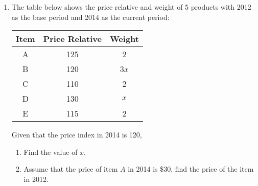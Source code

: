 \documentclass{report}
\begin{document}
\begin{multicols}{2}
\begin{enumerate}
    \item The table below shows the price relative and weight of 5 products with 2012 as
          the base period and 2014 as the current period:
          \begin{center}
            \begin{tabular}{|c|c|c|}
              \hline
              Item & Price Relative & Weight \\
              \hline
              A    & 125            & 2      \\
              B    & 120            & 3$x$   \\
              C    & 110            & 2      \\
              D    & 130            & $x$    \\
              E    & 115            & 2      \\
              \hline
            \end{tabular}
          \end{center}
          Given that the price index in 2014 is 120,
          \begin{enumerate}
            \item Find the value of $x$.
            \item Assume that the price of item $A$ in 2014 is \$30, find the price of the item
                  in 2012.
          \end{enumerate}


\end{enumerate}
\end{multicols}
\end{document}
